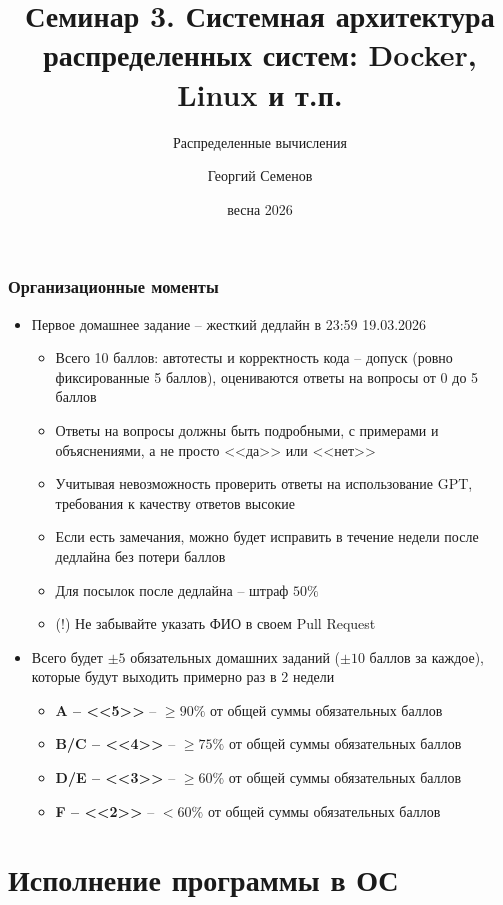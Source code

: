 \documentclass{beamer}
\title{Семинар 3. Системная архитектура распределенных систем: Docker, Linux и т.п.}
\subtitle{Распределенные вычисления}
\author{Георгий Семенов}
\institute{Институт прикладных компьютерных наук \\ Университет ИТМО}
\date{весна 2026}
\begin{document}
\frame{\titlepage}

\begin{frame}
\frametitle{Организационные моменты}

\begin{itemize}
  \item Первое домашнее задание – жесткий дедлайн в 23:59 19.03.2026
  \begin{itemize}
    \item Всего 10 баллов: автотесты и корректность кода – допуск (ровно фиксированные 5 баллов), оцениваются ответы на вопросы от 0 до 5 баллов
    \item Ответы на вопросы должны быть подробными, с примерами и объяснениями, а не просто <<да>> или <<нет>>
    \item Учитывая невозможность проверить ответы на использование GPT, требования к качеству ответов высокие
    \item Если есть замечания, можно будет исправить в течение недели после дедлайна без потери баллов
    \item Для посылок после дедлайна – штраф $50 \%$
    \item (!) Не забывайте указать ФИО в своем Pull Request
  \end{itemize}
  \item Всего будет $\pm 5$ обязательных домашних заданий ($\pm 10$ баллов за каждое), которые будут выходить примерно раз в 2 недели
  \begin{itemize}
    \item \textbf{A -- <<5>>} – $\geq 90\%$ от общей суммы обязательных баллов
    \item \textbf{B/C -- <<4>>} – $\geq 75\%$ от общей суммы обязательных баллов
    \item \textbf{D/E -- <<3>>} – $\geq 60\%$ от общей суммы обязательных баллов
    \item \textbf{F -- <<2>>} – $< 60\%$ от общей суммы обязательных баллов
	\end{itemize}
\end{itemize}

\end{frame}

\section{Исполнение программы в ОС}
\end{document}
